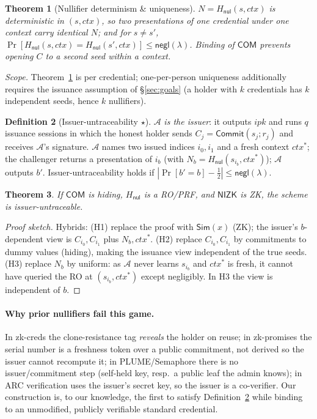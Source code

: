 \documentclass[11pt]{article}
\theoremstyle{plain}
\newtheorem{theorem}{Theorem}
\theoremstyle{definition}
\newtheorem{definition}[theorem]{Definition}
\begin{document}
\begin{theorem}[Nullifier determinism \& uniqueness]\label{thm:nullunique}
$N=H_{\mathsf{nul}}(s,\mathit{ctx})$ is deterministic in $(s,\mathit{ctx})$, so two
presentations of one credential under one context carry identical $N$; and for $s\ne
s'$, $\Pr[H_{\mathsf{nul}}(s,\mathit{ctx})=H_{\mathsf{nul}}(s',\mathit{ctx})]\le\mathsf{negl}(\lambda)$.
Binding of $\mathsf{COM}$ prevents opening $C$ to a second seed within a context.
\end{theorem}

\noindent\emph{Scope.} Theorem~\ref{thm:nullunique} is per credential; one-per-person
uniqueness additionally requires the issuance assumption of \S\ref{sec:goals} (a holder
with $k$ credentials has $k$ independent seeds, hence $k$ nullifiers).

\begin{definition}[Issuer-untraceability $\star$]\label{def:untrace}
$\mathcal{A}$ \emph{is the issuer}: it outputs $\mathit{ipk}$ and runs $q$ issuance
sessions in which the honest holder sends $C_j=\mathsf{Commit}(s_j;r_j)$ and receives
$\mathcal{A}$'s signature. $\mathcal{A}$ names two issued indices $i_0,i_1$ and a fresh
context $\mathit{ctx}^*$; the challenger returns a presentation of $i_b$ (with
$N_b=H_{\mathsf{nul}}(s_{i_b},\mathit{ctx}^*)$); $\mathcal{A}$ outputs $b'$.
Issuer-untraceability holds if $|\Pr[b'=b]-\tfrac12|\le\mathsf{negl}(\lambda)$.
\end{definition}
\begin{theorem}\label{thm:untrace}
If $\mathsf{COM}$ is hiding, $H_{\mathsf{nul}}$ is a RO/PRF, and $\mathsf{NIZK}$ is ZK,
the scheme is issuer-untraceable.
\end{theorem}
\begin{proof}[Proof sketch] Hybrids: (H1) replace the proof with $\mathsf{Sim}(x)$
(ZK); the issuer's $b$-dependent view is $C_{i_0},C_{i_1}$ plus $N_b,\mathit{ctx}^*$.
(H2) replace $C_{i_0},C_{i_1}$ by commitments to dummy values (hiding), making the
issuance view independent of the true seeds. (H3) replace $N_b$ by uniform: as
$\mathcal{A}$ never learns $s_{i_b}$ and $\mathit{ctx}^*$ is fresh, it cannot have
queried the RO at $(s_{i_b},\mathit{ctx}^*)$ except negligibly. In H3 the view is
independent of $b$. \end{proof}

\paragraph{Why prior nullifiers fail this game.} In zk-creds the clone-resistance tag
\emph{reveals} the holder on reuse; in zk-promises the serial number is a freshness
token over a public commitment, not derived so the issuer cannot recompute it; in
PLUME/Semaphore there is no issuer/commitment step (self-held key, resp.\ a public leaf
the admin knows); in ARC verification uses the issuer's secret key, so the issuer is a
co-verifier. Our construction is, to our knowledge, the first to satisfy
Definition~\ref{def:untrace} while binding to an unmodified, publicly verifiable
standard credential.
\end{document}
